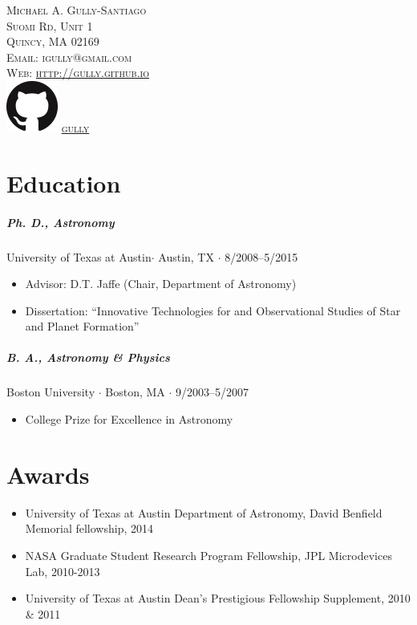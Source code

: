 \documentclass[10pt,letterpaper]{article}
\newcommand{\namestyle}{\Huge \scshape}
\newcommand{\addressstyle}{\color{addresscolor}  \footnotesize \sffamily \upshape}
\begin{document}
\begin{flushleft}
    \namestyle Michael A. Gully-Santiago \\[0.3em]
    \addressstyle 
    145 Suomi Rd, Unit 1 \\
    Quincy, MA 02169 \\
    Email: igully@gmail.com \\
    Web: \url{http://gully.github.io} \\
    \includegraphics[scale=0.17]{ghmark/GitHub-Mark/PNG/GitHub-Mark-64px.png} \href{http://github.com/gully}{gully}
\end{flushleft}

\small

\section*{Education}

\subparagraph{Ph. D., Astronomy}
University of Texas at Austin$\cdot$ Austin, TX $\cdot$ 8/2008--5/2015
\begin{itemize}
    \item Advisor: D.T. Jaffe (Chair, Department of Astronomy)
    \item Dissertation: ``Innovative Technologies for and Observational Studies of Star and Planet Formation''
\end{itemize}

\subparagraph{B. A., Astronomy \& Physics}
Boston University $\cdot$ Boston, MA $\cdot$ 9/2003--5/2007
\begin{itemize}
    \item College Prize for Excellence in Astronomy
\end{itemize}


\section*{Awards}

\begin{itemize}
    \item University of Texas at Austin Department of Astronomy, David Benfield Memorial fellowship, 2014
    \item NASA Graduate Student Research Program Fellowship, JPL Microdevices Lab, 2010-2013
    \item University of Texas at Austin Dean's Prestigious Fellowship Supplement, 2010 \& 2011
\end{itemize}
\end{document}
